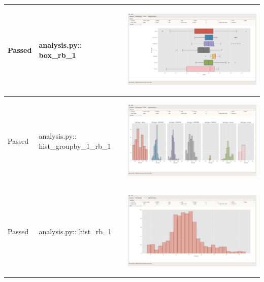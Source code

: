 \documentclass[11pt]{report}
\begin{document}
\begin{longtable}{|l|p{4.4cm}|C|}
\hline
\color{ForestGreen}Passed & analysis.py:: box\_rb\_1 & \begin{center}
\includegraphics[width=.9\linewidth]{./images/Screenshots/analysis_window_box_rb_1.png}
\end{center}\\
\hline
\color{ForestGreen}Passed & analysis.py:: hist\_groupby\_1\_rb\_1 & \begin{center}
\includegraphics[width=.9\linewidth]{./images/Screenshots/analysis_window_hist_groupby_1_rb_1.png}
\end{center}\\
\hline
\color{ForestGreen}Passed & analysis.py:: hist\_rb\_1 & \begin{center}
\includegraphics[width=.9\linewidth]{./images/Screenshots/analysis_window_hist_rb_1.png}

\end{center}
\end{longtable}
\end{document}
